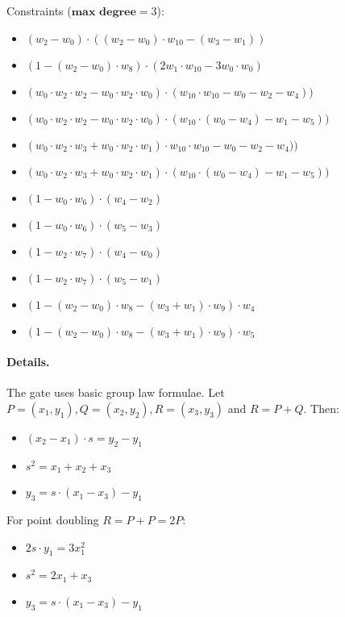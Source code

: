 Constraints ($\textbf{max degree} = 3$):
\begin{itemize}
\item $(w_2 - w_0)\cdot((w_2 - w_0) \cdot w_{10}- (w_3 - w_1))$
\item $(1 - (w_2- w_0)\cdot w_8)\cdot (2w_1\cdot w_10 - 3w_0 \cdot w_0)$
\item $(w_0 \cdot w_2\cdot w_2 - w_0 \cdot w_2\cdot w_0) \cdot (w_{10} \cdot w_{10} - w_0 - w_2 - w_4))$
\item $(w_0 \cdot w_2 \cdot w_2 - w_0 \cdot w_2 \cdot w_0) \cdot (w_{10}\cdot (w_0- w_4) - w_1 - w_5))$
\item $(w_0 \cdot w_2\cdot w_3 + w_0 \cdot w_2\cdot w_1) \cdot w_{10} \cdot w_{10} - w_0 - w_2  - w_4))$
\item $ (w_0 \cdot w_2\cdot w_3 + w_0 \cdot w_2\cdot w_1) \cdot(w_{10} \cdot (w_0 - w_4) - w_1 - w_5))$
\item $(1 - w_0\cdot w_6)\cdot(w_4 -w_2)$
\item $(1 - w_0 \cdot w_6)\cdot(w_5 - w_3)$
\item $(1 - w_2 \cdot w_7)\cdot(w_4 - w_0)$
\item$ (1 - w_2 \cdot w_7)\cdot(w_5 - w_1)$
\item $(1 - (w_2 - w_0)\cdot w_8 - (w_3 + w_1)\cdot w_9) \cdot w_4$
\item $(1 - (w_2 - w_0)\cdot w_8 - (w_3 + w_1) \cdot w_9) \cdot w_5$
\end{itemize}

\paragraph{Details.}

The gate uses basic group law formulae. 
Let $P = (x_1, y_1), Q = (x_2, y_2), R = (x_3, y_3)$ and $R = P + Q$. Then: 
\begin{itemize}
    \item $(x_2 - x_1) \cdot s = y_2 - y_1$
    \item $s^2 = x_1 + x_2 + x_3$
    \item $y_3 = s \cdot (x_1 - x_3) - y_1$
\end{itemize}
For point doubling $R = P + P = 2P$:
\begin{itemize}
    \item $2s \cdot y_1 = 3x_1^2$
    \item $s^2 = 2x_1 + x_3$
    \item $y_3 = s \cdot (x_1 - x_3) - y_1$
\end{itemize}


